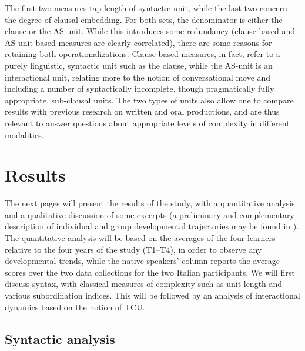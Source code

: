 \documentclass[output=paper]{langscibook}
\begin{document}
\begin{sloppypar}
The first two measures tap length of syntactic unit, while the last two concern the degree of clausal embedding. For both sets, the denominator is either the clause or the AS-unit. While this introduces some redundancy (clause-based and AS-unit-based measures are clearly correlated), there are some reasons for retaining both operationalizations. Clause-based measures, in fact, refer to a purely linguistic, syntactic unit such as the clause, while the AS-unit is an interactional unit, relating more to the notion of conversational move and including a number of syntactically incomplete, though pragmatically fully appropriate, sub-claus\-al units. The two types of units also allow one to compare results with previous research on written and oral productions, and are thus relevant to answer questions about appropriate levels of complexity in different modalities.
\end{sloppypar}

\section{Results}\label{sec:pallotti:4}\largerpage[2]

The next pages will present the results of the study, with a quantitative analysis and a qualitative discussion of some excerpts (a preliminary and complementary description of individual and group developmental trajectories may be found in \citealt{Ferrari2012}). The quantitative analysis will be based on the averages of the four learners relative to the four years of the study (T1--T4), in order to observe any developmental trends, while the native speakers’ column reports the average scores  over the two data collections for the two Italian participants. We will first discuss syntax, with classical measures of complexity such as unit length and various subordination indices. This will be followed by an analysis of interactional dynamics based on the notion of TCU. 

\subsection{\label{sec:pallotti:4.1} Syntactic analysis}
\end{document}
